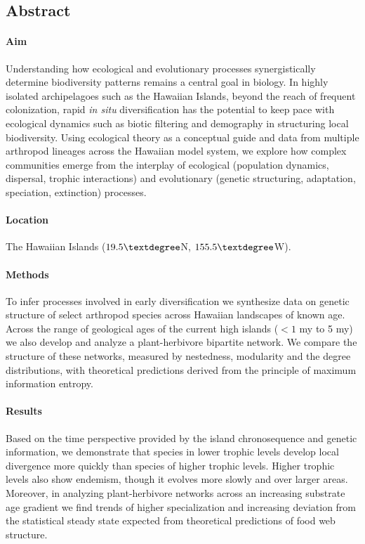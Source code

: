 \documentclass[12pt]{article}
\begin{document}
\clearpage

\begin{linenumbers}

\section*{Abstract}

\paragraph{Aim}
Understanding how ecological and evolutionary processes
synergistically determine biodiversity patterns remains a central goal
in biology. In highly isolated archipelagoes such as the Hawaiian
Islands, beyond the reach of frequent colonization, rapid {\it in
  situ} diversification has the potential to keep pace with ecological
dynamics such as biotic filtering and demography in structuring local
biodiversity. Using ecological theory as a conceptual guide and data
from multiple arthropod lineages across the Hawaiian model system, we
explore how complex communities emerge from the interplay of
ecological (population dynamics, dispersal, trophic interactions) and
evolutionary (genetic structuring, adaptation, speciation, extinction)
processes.

\paragraph{Location}
The Hawaiian Islands ($19.5\textdegree$N, $155.5\textdegree$W).

\paragraph{Methods}
To infer processes involved in early diversification we synthesize
data on genetic structure of select arthropod species across Hawaiian
landscapes of known age. Across the range of geological ages of the
current high islands ($< 1$ my to 5 my) we also develop and analyze a
plant-herbivore bipartite network. We compare the structure of these
networks, measured by nestedness, modularity and the degree
distributions, with theoretical predictions derived from the principle
of maximum information entropy.

\paragraph{Results}
Based on the time perspective provided by the island chronosequence
and genetic information, we demonstrate that species in lower trophic
levels develop local divergence more quickly than species of higher
trophic levels. Higher trophic levels also show endemism, though it
evolves more slowly and over larger areas. Moreover, in analyzing
plant-herbivore networks across an increasing substrate age gradient
we find trends of higher specialization and increasing deviation from
the statistical steady state expected from theoretical predictions of
food web structure.


\end{linenumbers}
\end{document}
